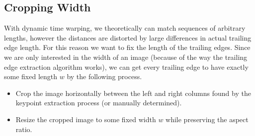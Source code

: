 




\subsection{Cropping Width}


With dynamic time warping, we theoretically can match sequences of arbitrary lengths, however the distances are distorted by large differences in actual trailing edge length.
For this reason we want to fix the length of the trailing edges.
Since we are only interested in the width of an image (because of the way the trailing edge extraction algorithm works), we can get every trailing edge to have exactly some fixed length $w$ by the following process.

\begin{itemize}
    \item Crop the image horizontally between the left and right columns found by the keypoint extraction process (or manually determined).
    \item Resize the cropped image to some fixed width $w$ while preserving the aspect ratio.%
\end{itemize}

